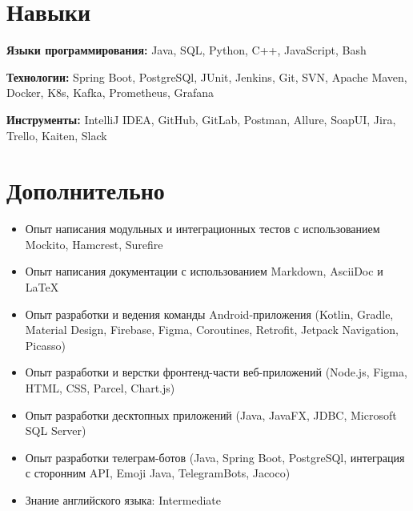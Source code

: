 \documentclass[a4paper,9pt]{report}
\newcommand{\bulletItem}[1]{\item[$\bullet$] #1}
\begin{document}
\vspace{-10pt}

\section{Навыки}
\begin{itemize}[leftmargin=0.15in, label={}]
\small{\item{

\textbf{Языки программирования:}{ Java, SQL, Python, C++, JavaScript, Bash} \\ \vspace{3pt}

\textbf{Технологии:}{ Spring Boot, PostgreSQl, JUnit, Jenkins, Git, SVN, Apache Maven, Docker, K8s, Kafka, Prometheus, Grafana} \\ \vspace{3pt}

\textbf{Инструменты:}{ IntelliJ IDEA, GitHub, GitLab, Postman, Allure, SoapUI, Jira, Trello, Kaiten, Slack} \\ \vspace{3pt}

}}
\end{itemize}
\vspace{-10pt}

\section{Дополнительно}

\begin{itemize}
\bulletItem{Опыт написания модульных и интеграционных тестов с использованием Mockito, Hamcrest, Surefire}
\bulletItem{Опыт написания документации с использованием Markdown, AsciiDoc и LaTeX}
\bulletItem{Опыт разработки и ведения команды Android-приложения (Kotlin, Gradle, Material Design, Firebase, Figma, Coroutines, Retrofit, Jetpack Navigation, Picasso)}
\bulletItem{Опыт разработки и верстки фронтенд-части веб-приложений (Node.js, Figma, HTML, CSS, Parcel, Chart.js)}
\bulletItem{Опыт разработки десктопных приложений (Java, JavaFX, JDBC, Microsoft SQL Server)}
\bulletItem{Опыт разработки телеграм-ботов (Java, Spring Boot, PostgreSQl, интеграция с сторонним API, Emoji Java, TelegramBots, Jacoco)}
\bulletItem{Знание английского языка: Intermediate}
\end{itemize}
\end{document}
